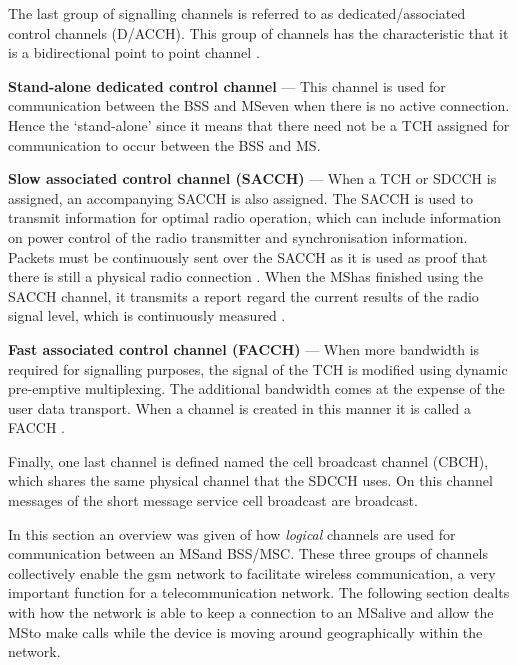 The last group of signalling channels is referred to as dedicated/associated control channels (D/ACCH). This group of channels has the characteristic that it is a bidirectional point to point channel \cite{GSMArchitectureProtocolsServices}.
\begin{description}
\item{\textbf{Stand-alone dedicated control channel}} --- This channel is used for communication between the BSS and \gls{MS}even when there is no active connection. Hence the `stand-alone' since it means that there need not be a TCH assigned for communication to occur between the BSS and \gls{MS}\cite{GSMArchitectureProtocolsServices}.
\item{\textbf{Slow associated control channel (SACCH)}} --- When a TCH or SDCCH is assigned, an accompanying SACCH is also assigned. The SACCH is used to transmit information for optimal radio operation, which can include information on power control of the radio transmitter and synchronisation information. Packets must be continuously sent over the SACCH as it is used as proof that there is still a physical radio connection \cite{GSMArchitectureProtocolsServices}. When the \gls{MS}has finished using the SACCH channel, it transmits a report regard the current results of the radio signal level, which is continuously measured \cite{GSMArchitectureProtocolsServices}.
\item{\textbf{Fast associated control channel (FACCH)}} --- When more bandwidth is required for signalling purposes, the signal of the TCH is modified using dynamic pre-emptive multiplexing. The additional bandwidth comes at the expense of the user data transport. When a channel is created in this manner it is called a FACCH \cite{GSMArchitectureProtocolsServices}.
\end{description}

Finally, one last channel is defined named the cell broadcast channel (CBCH), which shares the same physical channel that the SDCCH uses. On this channel messages of the short message service cell broadcast are broadcast\cite{GSMArchitectureProtocolsServices}.

In this section an overview was given of how \emph{logical} channels are used for communication between an \gls{MS}and BSS/MSC\@. These three groups of channels collectively enable the \gls{gsm} network to facilitate wireless communication, a very important function for a telecommunication network. The following section dealts with how the network is able to keep a connection to an \gls{MS}alive and allow the \gls{MS}to make calls while the device is moving around geographically within the network.
